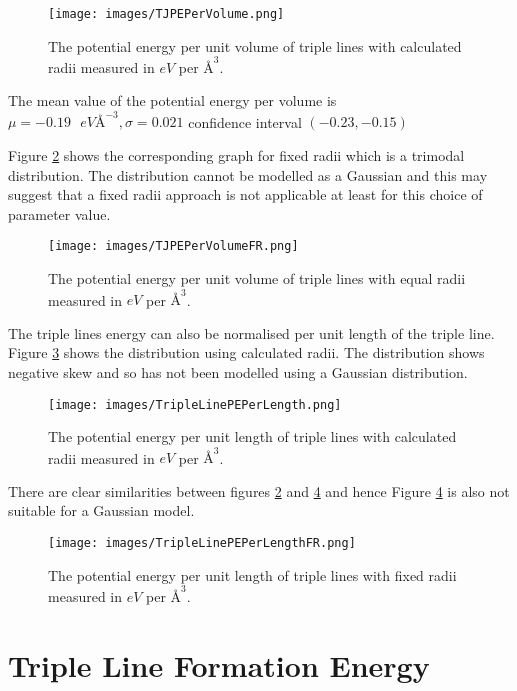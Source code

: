 \documentclass[12pt,a4paper,openany]{report}
\begin{document}
\begin{figure}[H]
	\texttt{[image: images/TJPEPerVolume.png]} 
	\caption{The potential energy per unit volume of triple lines with calculated radii measured in $eV$ per $\textrm{\AA}^3$.}	
	\label{fig:PEPerVol}
\end{figure}
The mean value of the potential energy per volume is $\mu = -0.19 \text{ } eV \textrm{\AA}^{-3}, \sigma = 0.021$ confidence interval $(-0.23, -0.15)$

Figure \ref{fig:PEPerVolFR} shows the corresponding graph for fixed radii which is a trimodal distribution. The distribution cannot be modelled as a Gaussian and this may suggest that a fixed radii approach is not applicable at least for this choice of parameter value.

\begin{figure}
	\texttt{[image: images/TJPEPerVolumeFR.png]} 
		\caption{The potential energy per unit volume of triple lines with equal radii measured in $eV$ per $\textrm{\AA}^3$.}	
	\label{fig:PEPerVolFR}
\end{figure}

\newpage
The triple lines energy can also be normalised per unit length of the triple line. Figure \ref{fig:PEPerLength} shows the distribution using calculated radii. The distribution shows negative skew and so has not been modelled using a Gaussian distribution.   

\begin{figure}[H]
	\texttt{[image: images/TripleLinePEPerLength.png]}
	\caption{The potential energy per unit length of triple lines with calculated radii measured in $eV$ per $\textrm{\AA}^3$.}	
	\label{fig:PEPerLength} 
\end{figure}

\newpage
There are clear similarities between figures \ref{fig:PEPerVolFR} and \ref{fig:PEPerLengthFR} and hence Figure \ref{fig:PEPerLengthFR} is also not suitable for a Gaussian model.


\begin{figure}[H]
\texttt{[image: images/TripleLinePEPerLengthFR.png]}  
	\caption{The potential energy per unit length of triple lines with fixed radii measured in $eV$ per $\textrm{\AA}^3$.}	
	\label{fig:PEPerLengthFR} 
\end{figure}


\newpage


\section{Triple Line Formation Energy}
\end{document}
